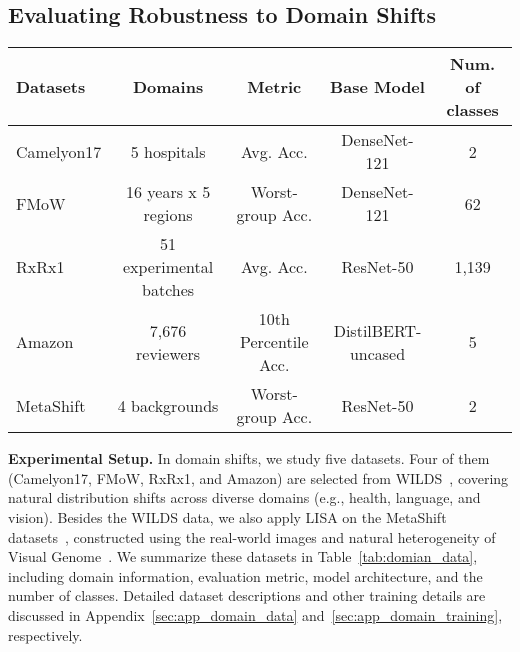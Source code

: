 \subsection{Evaluating Robustness to Domain Shifts}
\label{sec:exp_main_domain}
\begin{table*}[h]
\caption{Dataset Statistics for Domain Shifts.}
\vspace{0.5em}
\small
\label{tab:domian_data}
\begin{center}
\begin{tabular}{l|cccc }
\toprule
Datasets  & Domains & Metric & Base Model & Num. of classes \\\midrule
Camelyon17 & 5 hospitals & Avg. Acc. & DenseNet-121 & 2\\
FMoW & 16 years x 5 regions & Worst-group Acc. & DenseNet-121 & 62\\
RxRx1 & 51 experimental batches & Avg. Acc. & ResNet-50 & 1,139\\
Amazon & 7,676 reviewers & 10th Percentile Acc. & DistilBERT-uncased & 5\\
MetaShift & 4 backgrounds & Worst-group Acc. & ResNet-50 & 2 \\
\bottomrule
\end{tabular}
\end{center}
\vspace{-2em}
\end{table*}
\textbf{Experimental Setup.} In domain shifts, we study five datasets. Four of them (Camelyon17, FMoW, RxRx1, and Amazon) are selected from WILDS~\citep{koh2021wilds}, covering natural distribution shifts across diverse domains (e.g., health, language, and vision). Besides the WILDS data, we also apply LISA on the MetaShift datasets~\citep{metadataset}, constructed using the real-world images and natural heterogeneity of Visual Genome~\citep{krishnavisualgenome}. We summarize these datasets in Table~\ref{tab:domian_data}, including domain information, evaluation metric, model architecture, and the number of classes. Detailed dataset descriptions and other training details are discussed in Appendix~\ref{sec:app_domain_data} and~\ref{sec:app_domain_training}, respectively.

